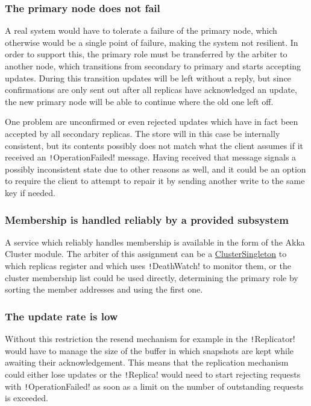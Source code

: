 \documentclass{article}
\begin{document}
\subsubsection{The primary node does not fail}

A real system would have to tolerate a failure of the primary node,  which otherwise would be a single point of failure, making the system  not resilient. In order to support this, the primary role must be  transferred by the arbiter to another node, which transitions from  secondary to primary and starts accepting updates. During this transition  updates will be left without a reply, but since confirmations are only  sent out after all replicas have acknowledged an update, the new primary  node will be able to continue where the old one left off.

One problem are unconfirmed or even rejected updates which have in  fact been accepted by all secondary replicas. The store will in this  case be internally consistent, but its contents possibly does not match  what the client assumes if it received an \texttt!OperationFailed!  message. Having received that message signals a possibly inconsistent  state due to other reasons as well, and it could be an option to require  the client to attempt to repair it by sending another write to the same  key if needed.

\subsubsection{Membership is handled reliably by a provided subsystem}

A service which reliably handles membership is available in the form  of the Akka Cluster module. The arbiter of this assignment can be a 
\href{http://doc.akka.io/docs/akka/2.2.3/scala/cluster-usage.html#Cluster_Singleton_Pattern}{ClusterSingleton}
  to which replicas register and which uses \texttt!DeathWatch! to monitor them,  or the cluster membership list could be used directly, determining the  primary role by sorting the member addresses and using the first one.

  \subsubsection{The update rate is low}

Without this restriction the resend mechanism for example in the \texttt!Replicator! would have to manage the size of the buffer in which snapshots are kept while awaiting their acknowledgement. This means that the replication mechanism could either lose updates or the \texttt!Replica! would need to start rejecting requests with \texttt!OperationFailed! as soon as a limit on the number of outstanding requests is exceeded.
\end{document}
